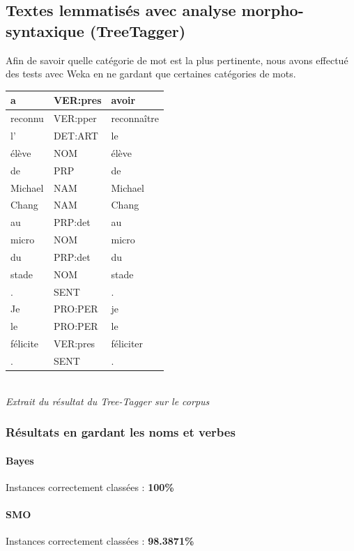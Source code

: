 \documentclass[a4paper,11pt]{article}
\begin{document}
\subsection{Textes lemmatisés avec analyse morpho-syntaxique (TreeTagger)}
Afin de savoir quelle catégorie de mot est la plus pertinente, nous avons effectué des tests avec Weka en ne gardant que certaines catégories de mots.

\begin{center}
\begin{tabular}{|C{2.5cm}|C{2.5cm}|C{2.5cm}|}
\hline 
a & VER:pres & avoir \\ \hline
reconnu & VER:pper & reconnaître  \\ \hline
l' & DET:ART & le  \\ \hline
élève & NOM & élève  \\ \hline
de & PRP & de  \\ \hline
Michael & NAM & Michael  \\ \hline
Chang & NAM & Chang  \\ \hline
au & PRP:det & au  \\ \hline
micro & NOM & micro \\ \hline
du & PRP:det & du  \\ \hline
stade & NOM & stade  \\ \hline
. & SENT & .  \\ \hline
Je & PRO:PER & je  \\ \hline
le & PRO:PER & le  \\ \hline
félicite & VER:pres & féliciter  \\ \hline
. & SENT & .  \\ \hline
\end{tabular}\\
\textit{Extrait du résultat du Tree-Tagger sur le corpus}
\end{center}

\subsubsection{Résultats en gardant les noms et verbes}
\paragraph{Bayes} Instances correctement classées : \textbf{100\%}
\paragraph{SMO} Instances correctement classées : \textbf{98.3871\%}
\end{document}
